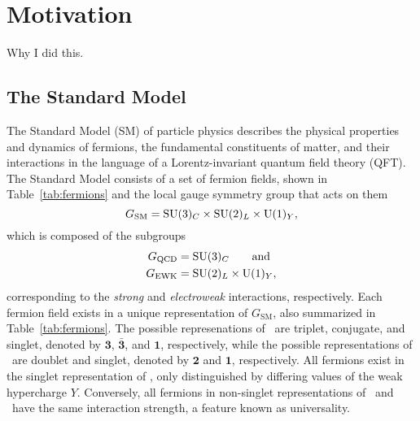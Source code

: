 \chapter{Motivation}

Why I did this.

\section{The Standard Model}
\label{sec:sm}

The Standard Model (SM) of particle physics describes the physical properties and dynamics of fermions, the fundamental constituents of matter, and their interactions in the language of a Lorentz-invariant quantum field theory (QFT).
The Standard Model consists of a set of fermion fields, shown in Table~\ref{tab:fermions} and the local gauge symmetry group that acts on them
\begin{equation}
  G_{\text{SM}} = \text{SU}(3)_C \times \text{SU}(2)_L \times \text{U}(1)_Y,
\end{equation}
which is composed of the subgroups
\begin{align}
  G_{\text{QCD}} & = \text{SU}(3)_C \qquad \text{and} \\
  G_{\text{EWK}} & = \text{SU}(2)_L \times \text{U}(1)_Y,
\end{align}
corresponding to the \textit{strong} and \textit{electroweak} interactions, respectively.
Each fermion field exists in a unique representation of $G_{\text{SM}}$, also summarized in Table~\ref{tab:fermions}.
The possible represenations of \suthree\ are triplet, conjugate, and singlet, denoted by $\mathbf{3}$, $\mathbf{\bar{3}}$, and $\mathbf{1}$, respectively, while the possible representations of \sutwo\ are doublet and singlet, denoted by $\mathbf{2}$ and $\mathbf{1}$, respectively.
All fermions exist in the singlet representation of \uone, only distinguished by differing values of the weak hypercharge $Y$.
Conversely, all fermions in non-singlet representations of \suthree\ and \sutwo\ have the same interaction strength, a feature known as universality.

